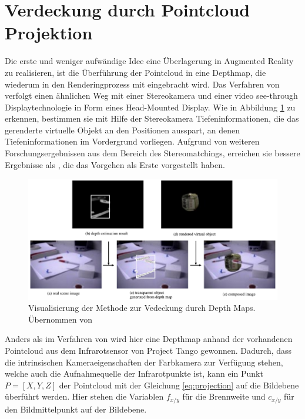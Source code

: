 \section{Verdeckung durch Pointcloud Projektion} \label{sec:pc-projection}

Die erste und weniger aufwändige Idee eine Überlagerung in Augmented Reality zu realisieren, ist die Überführung der Pointcloud in eine Depthmap, die wiederum in den Renderingprozess mit eingebracht wird. Das Verfahren von \citet{kanbara2000stereoscopic} verfolgt einen ähnlichen Weg mit einer Stereokamera und einer video see-through Displaytechnologie in Form eines Head-Mounted Display. Wie in Abbildung \ref{fig:stereo-depth-map} zu erkennen, bestimmen sie mit Hilfe der Stereokamera Tiefeninformationen, die das gerenderte virtuelle Objekt an den Positionen ausspart, an denen Tiefeninformationen im Vordergrund vorliegen. Aufgrund von weiteren Forschungsergebnissen aus dem Bereich des Stereomatchings, erreichen sie bessere Ergebnisse als \citet{wloka1995resolving}, die das Vorgehen als Erste vorgestellt haben.

\begin{figure}[h]
  \centering
	\includegraphics[width=1.0\textwidth]{content/images/methods/stereo-depth-map.png} 
  \caption{Visualisierung der Methode zur Vedeckung durch Depth Maps. Übernommen von \citet{kanbara2000stereoscopic}}
  \label{fig:stereo-depth-map}
\end{figure}

Anders als im Verfahren von \citet{kanbara2000stereoscopic} wird hier eine Depthmap anhand der vorhandenen Pointcloud aus dem Infrarotsensor von Project Tango gewonnen. Dadurch, dass die intrinsischen Kameraeigenschaften der Farbkamera zur Verfügung stehen, welche auch die Aufnahmequelle der Infrarotpunkte ist, kann ein Punkt \(P = [X, Y, Z]\) der Pointcloud mit der Gleichung \ref{eq:projection} auf die Bildebene überführt werden. Hier stehen die Variablen \(f_{x/y}\) für die Brennweite und \(c_{x/y}\) für den Bildmittelpunkt auf der Bildebene. \citep{Tango90:online}

